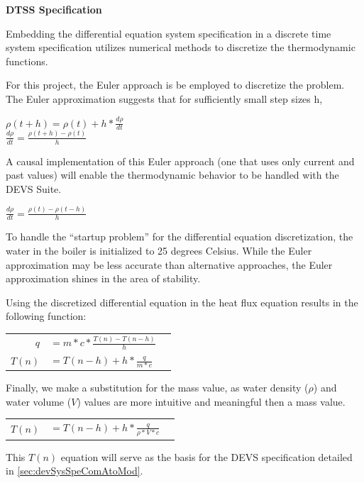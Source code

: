 \documentclass[10pt]{article}
\begin{document}
\textbf{DTSS Specification}

Embedding the differential equation system specification in a discrete time system specification utilizes numerical methods to discretize the thermodynamic functions.  

For this project, the Euler approach is be employed to discretize the problem.  The Euler approximation suggests that for sufficiently small step sizes h,
\begin{center}
  $\rho(t+h)=\rho(t)+h*\frac{d\rho}{dt}$ \\
  $\frac{d\rho}{dt}=\frac{\rho(t+h)-\rho(t)}{h}$ \\
\end{center}
A causal implementation of this Euler approach (one that uses only current and past values) will enable the thermodynamic behavior to be handled with the DEVS Suite.
\begin{center}
  $\frac{d\rho}{dt}=\frac{\rho(t)-\rho(t-h)}{h}$ \\
\end{center}

To handle the ``startup problem'' for the differential equation discretization, the water in the boiler is initialized to 25 degrees Celsius.  While the Euler approximation may be less accurate than alternative approaches, the Euler approximation shines in the area of stability.  

Using the discretized differential equation in the heat flux equation results in the following function:
\begin{center}
  \begin{tabular}{r l l}
    $q$ & $=m*c*\frac{T(n)-T(n-h)}{h}$ \\
    $T(n)$ & $=T(n-h)+h*\frac{q}{m*c}$ \\
  \end{tabular}
\end{center}
Finally, we make a substitution for the mass value, as water density ($\rho$) and water volume ($V$) values are more intuitive and meaningful then a mass value.
\begin{center}
  \begin{tabular}{r l l}
    $T(n)$ & $=T(n-h)+h*\frac{q}{\rho*V*c}$ \\
  \end{tabular}
\end{center}
This $T(n)$ equation will serve as the basis for the DEVS specification detailed in \ref{sec:devSysSpeComAtoMod}.
\end{document}
